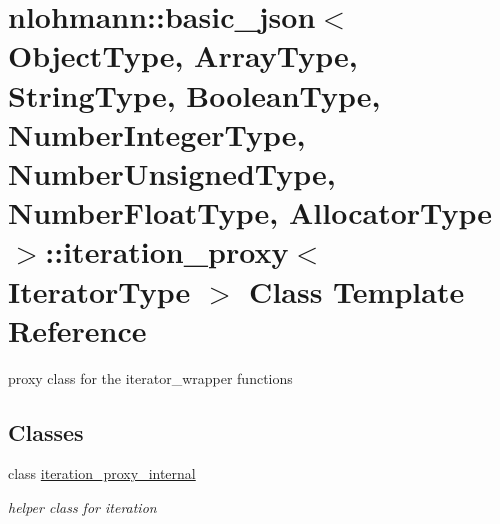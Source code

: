 \hypertarget{classnlohmann_1_1basic__json_1_1iteration__proxy}{}\section{nlohmann\+:\+:basic\+\_\+json$<$ Object\+Type, Array\+Type, String\+Type, Boolean\+Type, Number\+Integer\+Type, Number\+Unsigned\+Type, Number\+Float\+Type, Allocator\+Type $>$\+:\+:iteration\+\_\+proxy$<$ Iterator\+Type $>$ Class Template Reference}
\label{classnlohmann_1_1basic__json_1_1iteration__proxy}


proxy class for the iterator\+\_\+wrapper functions  


\subsection*{Classes}
\begin{DoxyCompactItemize}
\item 
class \hyperlink{classnlohmann_1_1basic__json_1_1iteration__proxy_1_1iteration__proxy__internal}{iteration\+\_\+proxy\+\_\+internal}
\begin{DoxyCompactList}\small\item\em helper class for iteration \end{DoxyCompactList}\end{DoxyCompactItemize}
